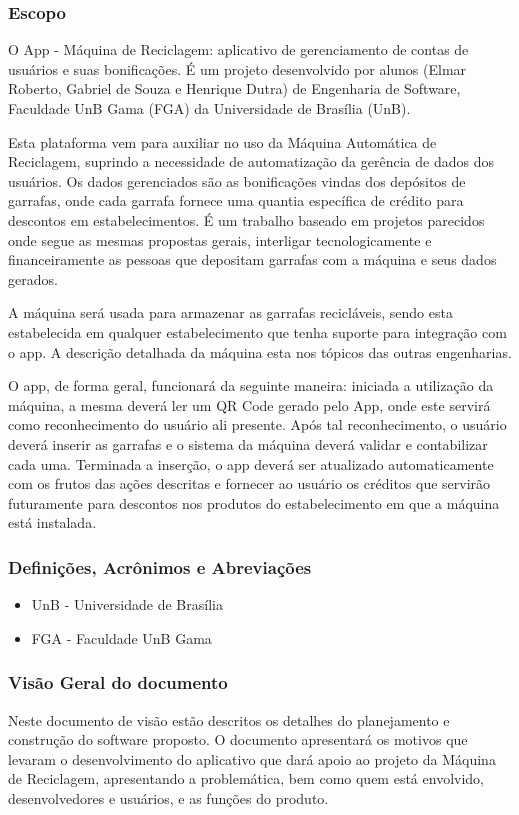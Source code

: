 \begin{apendicesenv}
\subsubsection{Escopo}
O App - Máquina de Reciclagem: aplicativo de gerenciamento de contas de usuários e suas bonificações. É um projeto desenvolvido por alunos (Elmar Roberto, Gabriel de Souza e Henrique Dutra) de Engenharia de Software, Faculdade UnB Gama (FGA) da Universidade de Brasília (UnB).

Esta plataforma vem para auxiliar no uso da Máquina Automática de Reciclagem, suprindo a necessidade de automatização da gerência de dados dos usuários. Os dados gerenciados são as bonificações vindas dos depósitos de garrafas, onde cada garrafa fornece uma quantia específica de crédito para descontos em estabelecimentos. É um trabalho baseado em projetos parecidos onde segue as mesmas propostas gerais, interligar tecnologicamente e financeiramente as pessoas que depositam garrafas com a máquina e seus dados gerados.

A máquina será usada para armazenar as garrafas recicláveis, sendo esta estabelecida em qualquer estabelecimento que tenha suporte para integração com o app. A descrição detalhada da máquina esta nos tópicos das outras engenharias.

O app, de forma geral, funcionará da seguinte maneira: iniciada a utilização da máquina, a mesma deverá ler um QR Code gerado pelo App, onde este servirá como reconhecimento do usuário ali presente. Após tal reconhecimento, o usuário deverá inserir as garrafas e o sistema da máquina deverá validar e contabilizar cada uma. Terminada a inserção, o app deverá ser atualizado automaticamente com os frutos das ações descritas e fornecer ao usuário os créditos que servirão futuramente para descontos nos produtos do estabelecimento em que a máquina está instalada.

\subsubsection{Definições, Acrônimos e Abreviações}

\begin{itemize}
    \item UnB - Universidade de Brasília
    \item FGA - Faculdade UnB Gama
\end{itemize}

\subsubsection{Visão Geral do documento}
Neste documento de visão estão descritos os detalhes do planejamento e construção do software proposto. O documento apresentará os motivos que levaram o desenvolvimento do aplicativo que dará apoio ao projeto da Máquina de Reciclagem, apresentando a problemática, bem como quem está envolvido, desenvolvedores e usuários, e as funções do produto.


\end{apendicesenv}
